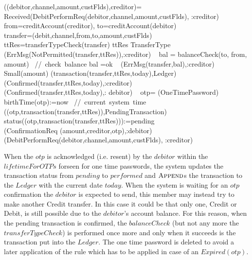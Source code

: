\begin{asm}
((debitor,channel,amount,custFlds),creditor)=\+
\IF  Received(DebitPerformReq(debitor,channel,amount,custFlds),
                 \FROM :creditor) \THEN \+     
  \LET from=creditAccount(creditor), to=creditAccount(debitor)\\
  \LET transfer=(debit,channel,from,to,amount,custFlds) \\
  \LET ttRes=transferTypeCheck(transfer) \+
        \IF ttRes \not \in TransferType \THEN \+    (ErrMsg(NotPermitted(transfer,ttRes)),\TO :creditor)\-
       \ELSE~  \LET bal = balanceCheck(to, from, amount)  
                \mbox{ // check balance}\+
       \IF bal \not =ok \THEN ~ (ErrMsg(transfer,bal),\TO :creditor)   \ELSE \+
         \IF Small(amount) \+
              \THEN \+ 
                   (transaction(transfer,ttRes,today),Ledger) \\
                   (Confirmed(transfer,ttRes,today),\TO :creditor)\\
                   (Confirmed(transfer,ttRes,today),\TO : debitor)\-
              \ELSE ~ \LET otp= \NEW(OneTimePassword)\+
                  birthTime(otp):=now \mbox{ // current system time}\\
                  ((otp,transaction(transfer,ttRes)),PendingTransaction)\\ 
                   status((otp,transaction(transfer,ttRes))):=pending \\
                   (ConfirmationReq
                    (amount,creditor,otp),\TO :debitor)\dec\dec\dec\dec\-
   (DebitPerformReq(debitor,channel,amount,custFlds),
                 \FROM :creditor)
\end{asm}
             
When the $otp$ is acknowledged (i.e. resent) by the $debitor$ 
within the $lifetimeForOTPs$ forseen for one time passwords, the system updates the transaction status from $pending$ to $performed$ and 
$\hbox{\sc Append}$s the transaction to the $Ledger$ with the current date $today$. When the system is waiting for an $otp$ confirmation the $debitor$ is expected to send, this member may instead try to make another Credit transfer. In this case it could be that only one, Credit or Debit, is still possible due to the $debitor$'s account balance. For this reason, when the pending transaction is confirmed, the $balanceCheck$  (but not any more the $transferTypeCheck$) is performed once more and only when it succeeds is the transaction put into the $Ledger$. The one time password is deleted to avoid a later application of the rule which has to be applied in case of an $Expired(otp)$. 
              

